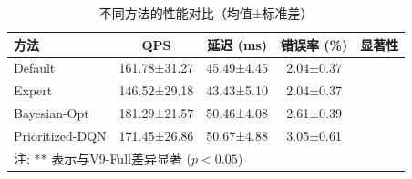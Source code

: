 \begin{table}[htbp]
\centering
\caption{不同方法的性能对比（均值±标准差）}
\label{tab:comparison}
\begin{tabular}{lcccc}
\hline
方法 & QPS & 延迟 (ms) & 错误率 (\%) & 显著性 \\
\hline
Default & 161.78±31.27 & 45.49±4.45 & 2.04±0.37 &  \\
Expert & 146.52±29.18 & 43.43±5.10 & 2.04±0.37 &  \\
Bayesian-Opt & 181.29±21.57 & 50.46±4.08 & 2.61±0.39 &  \\
Prioritized-DQN & 171.45±26.86 & 50.67±4.88 & 3.05±0.61 &  \\
\hline
\multicolumn{5}{l}{注: ** 表示与V9-Full差异显著 ($p<0.05$)} \\
\end{tabular}
\end{table}